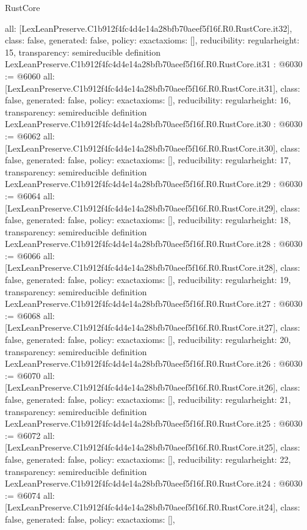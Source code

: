 \begin{lexlean}{RustCore}
\begin{coremodule}
{  all: [LexLeanPreserve.C1b912f4fc4d4e14a28bfb70aeef5f16f.R0.RustCore.it32],
  class: false,
  generated: false,
  policy: exact{axioms: []},
  reducibility: regular{height: 15},
  transparency: semireducible
}
definition LexLeanPreserve.C1b912f4fc4d4e14a28bfb70aeef5f16f.R0.RustCore.it31 : @6030 := @6060 {
  all: [LexLeanPreserve.C1b912f4fc4d4e14a28bfb70aeef5f16f.R0.RustCore.it31],
  class: false,
  generated: false,
  policy: exact{axioms: []},
  reducibility: regular{height: 16},
  transparency: semireducible
}
definition LexLeanPreserve.C1b912f4fc4d4e14a28bfb70aeef5f16f.R0.RustCore.it30 : @6030 := @6062 {
  all: [LexLeanPreserve.C1b912f4fc4d4e14a28bfb70aeef5f16f.R0.RustCore.it30],
  class: false,
  generated: false,
  policy: exact{axioms: []},
  reducibility: regular{height: 17},
  transparency: semireducible
}
definition LexLeanPreserve.C1b912f4fc4d4e14a28bfb70aeef5f16f.R0.RustCore.it29 : @6030 := @6064 {
  all: [LexLeanPreserve.C1b912f4fc4d4e14a28bfb70aeef5f16f.R0.RustCore.it29],
  class: false,
  generated: false,
  policy: exact{axioms: []},
  reducibility: regular{height: 18},
  transparency: semireducible
}
definition LexLeanPreserve.C1b912f4fc4d4e14a28bfb70aeef5f16f.R0.RustCore.it28 : @6030 := @6066 {
  all: [LexLeanPreserve.C1b912f4fc4d4e14a28bfb70aeef5f16f.R0.RustCore.it28],
  class: false,
  generated: false,
  policy: exact{axioms: []},
  reducibility: regular{height: 19},
  transparency: semireducible
}
definition LexLeanPreserve.C1b912f4fc4d4e14a28bfb70aeef5f16f.R0.RustCore.it27 : @6030 := @6068 {
  all: [LexLeanPreserve.C1b912f4fc4d4e14a28bfb70aeef5f16f.R0.RustCore.it27],
  class: false,
  generated: false,
  policy: exact{axioms: []},
  reducibility: regular{height: 20},
  transparency: semireducible
}
definition LexLeanPreserve.C1b912f4fc4d4e14a28bfb70aeef5f16f.R0.RustCore.it26 : @6030 := @6070 {
  all: [LexLeanPreserve.C1b912f4fc4d4e14a28bfb70aeef5f16f.R0.RustCore.it26],
  class: false,
  generated: false,
  policy: exact{axioms: []},
  reducibility: regular{height: 21},
  transparency: semireducible
}
definition LexLeanPreserve.C1b912f4fc4d4e14a28bfb70aeef5f16f.R0.RustCore.it25 : @6030 := @6072 {
  all: [LexLeanPreserve.C1b912f4fc4d4e14a28bfb70aeef5f16f.R0.RustCore.it25],
  class: false,
  generated: false,
  policy: exact{axioms: []},
  reducibility: regular{height: 22},
  transparency: semireducible
}
definition LexLeanPreserve.C1b912f4fc4d4e14a28bfb70aeef5f16f.R0.RustCore.it24 : @6030 := @6074 {
  all: [LexLeanPreserve.C1b912f4fc4d4e14a28bfb70aeef5f16f.R0.RustCore.it24],
  class: false,
  generated: false,
  policy: exact{axioms: []},
}
\end{coremodule}
\end{lexlean}
